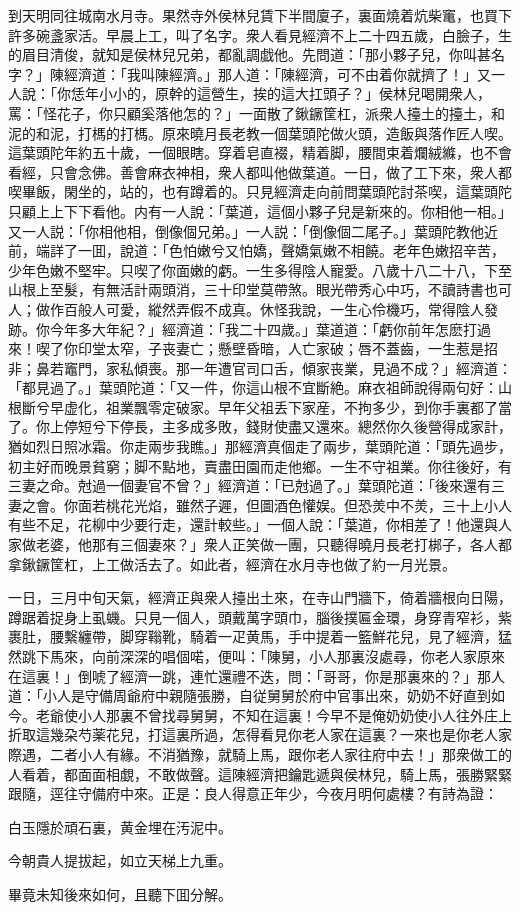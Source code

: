 到天明同往城南水月寺。果然寺外侯林兒賃下半間廈子，裏面燒着炕柴竃，也買下許多碗盞家活。早晨上工，叫了名字。衆人看見經濟不上二十四五歲，白臉子，生的眉目清俊，就知是侯林兒兄弟，都亂調戯他。先問道：「那小夥子兒，你叫甚名字？」陳經濟道：「我叫陳經濟。」那人道：「陳經濟，可不由着你就擠了！」又一人說：「你恁年小小的，原幹的這營生，挨的這大扛頭子？」侯林兒喝開衆人，罵：「怪花子，你只顧奚落他怎的？」一面散了鍬鐝筐杠，派衆人擡土的擡土，和泥的和泥，打榪的打榪。原來曉月長老教一個葉頭陀做火頭，造飯與落作匠人喫。這葉頭陀年約五十歲，一個眼瞎。穿着皂直裰，精着脚，腰間束着爛絨縧，也不會看經，只會念佛。善會麻衣神相，衆人都叫他做葉道。一日，做了工下來，衆人都喫畢飯，閑坐的，站的，也有蹲着的。只見經濟走向前問葉頭陀討茶喫，這葉頭陀只顧上上下下看他。内有一人說：「葉道，這個小夥子兒是新來的。你相他一相。」又一人説：「你相他相，倒像個兄弟。」一人説：「倒像個二尾子。」葉頭陀教他近前，端詳了一囬，說道：「色怕嫩兮又怕嬌，聲嬌氣嫩不相饒。老年色嫩招辛苦，少年色嫩不堅牢。只喫了你面嫩的虧。一生多得陰人寵愛。八歲十八二十八，下至山根上至髮，有無活計兩頭消，三十印堂莫帶煞。眼光帶秀心中巧，不讀詩書也可人；做作百般人可愛，縱然弄假不成真。休怪我說，一生心伶機巧，常得陰人發跡。你今年多大年紀？」經濟道：「我二十四歲。」葉道道：「虧你前年怎麽打過來！喫了你印堂太窄，子丧妻亡；懸壁昏暗，人亡家破；唇不蓋齒，一生惹是招非；鼻若竈門，家私傾喪。那一年遭官司口舌，傾家丧業，見過不成？」經濟道：「都見過了。」葉頭陀道：「又一件，你這山根不宜斷絶。麻衣祖師說得兩句好：山根斷兮早虚化，祖業飄零定破家。早年父祖丢下家産，不拘多少，到你手裏都了當了。你上停短兮下停長，主多成多敗，錢財使盡又還來。總然你久後營得成家計，猶如烈日照冰霜。你走兩步我瞧。」那經濟真個走了兩步，葉頭陀道：「頭先過步，初主好而晚景貧窮；脚不點地，賣盡田園而走他鄉。一生不守祖業。你往後好，有三妻之命。尅過一個妻官不曾？」經濟道：「已尅過了。」葉頭陀道：「後來還有三妻之會。你面若桃花光焰，雖然子遲，但圖酒色懽娱。但恐羙中不羙，三十上小人有些不足，花柳中少要行走，還計較些。」一個人說：「葉道，你相差了！他還與人家做老婆，他那有三個妻來？」衆人正笑做一團，只聽得曉月長老打梆子，各人都拿鍬鐝筐杠，上工做活去了。如此者，經濟在水月寺也做了約一月光景。

一日，三月中旬天氣，經濟正與衆人擡出土來，在寺山門牆下，倚着牆根向日陽，蹲踞着捉身上虱蟣。只見一個人，頭戴萬字頭巾，腦後撲匾金環，身穿青窄衫，紫裹肚，腰繫纏帶，脚穿䩺靴，騎着一疋黄馬，手中提着一籃鮮花兒，見了經濟，猛然跳下馬來，向前深深的唱個喏，便叫：「陳舅，小人那裏沒處尋，你老人家原來在這裏！」倒唬了經濟一跳，連忙還禮不迭，問：「哥哥，你是那裏來的？」那人道：「小人是守備周爺府中親隨張勝，自従舅舅於府中官事出來，奶奶不好直到如今。老爺使小人那裏不曾找尋舅舅，不知在這裏！今早不是俺奶奶使小人往外庄上折取這幾朶芍薬花兒，打這裏所過，怎得看見你老人家在這裏？一來也是你老人家際遇，二者小人有緣。不消猶豫，就騎上馬，跟你老人家往府中去！」那衆做工的人看着，都面面相覷，不敢做聲。這陳經濟把鑰匙遞與侯林兒，騎上馬，張勝緊緊跟隨，逕往守備府中來。正是：良人得意正年少，今夜月明何處樓？有詩為證：

\begin{myquote}
白玉隱於頑石裏，黄金埋在汚泥中。

今朝貴人提拔起，如立天梯上九重。
\end{myquote}

畢竟未知後來如何，且聽下囬分解。

